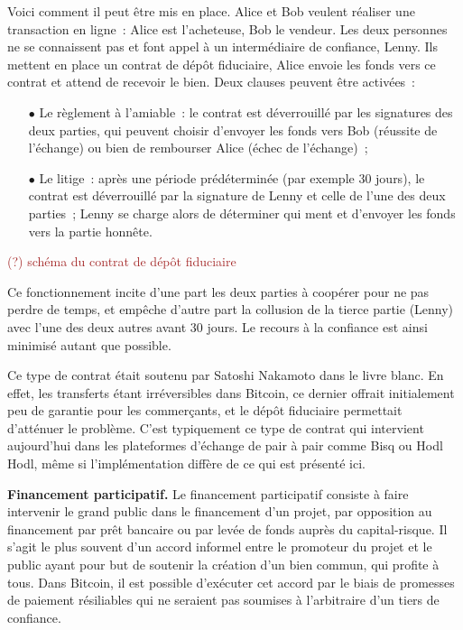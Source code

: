 Voici comment il peut être mis en place. Alice et Bob veulent réaliser une transaction en ligne~: Alice est l'acheteuse, Bob le vendeur. Les deux personnes ne se connaissent pas et font appel à un intermédiaire de confiance, Lenny. Ils mettent en place un contrat de dépôt fiduciaire, Alice envoie les fonds vers ce contrat et attend de recevoir le bien. Deux clauses peuvent être activées~:

\begin{itemize}
\item[$\bullet$] Le règlement à l'amiable~: le contrat est déverrouillé par les signatures des deux parties, qui peuvent choisir d'envoyer les fonds vers Bob (réussite de l'échange) ou bien de rembourser Alice (échec de l'échange)~;
\item[$\bullet$] Le litige~: après une période prédéterminée (par exemple 30 jours), le contrat est déverrouillé par la signature de Lenny et celle de l'une des deux parties~; Lenny se charge alors de déterminer qui ment et d'envoyer les fonds vers la partie honnête.
\end{itemize}

\textcolor{brown}{(?) schéma du contrat de dépôt fiduciaire}

Ce fonctionnement incite d'une part les deux parties à coopérer pour ne pas perdre de temps, et empêche d'autre part la collusion de la tierce partie (Lenny) avec l'une des deux autres avant 30 jours. Le recours à la confiance est ainsi minimisé autant que possible.

Ce type de contrat était soutenu par Satoshi Nakamoto dans le livre blanc. En effet, les transferts étant irréversibles dans Bitcoin, ce dernier offrait initialement peu de garantie pour les commerçants, et le dépôt fiduciaire permettait d'atténuer le problème. C'est typiquement ce type de contrat qui intervient aujourd'hui dans les plateformes d'échange de pair à pair comme Bisq ou Hodl Hodl, même si l'implémentation diffère de ce qui est présenté ici.


\textbf{Financement participatif.} Le financement participatif consiste à faire intervenir le grand public dans le financement d'un projet, par opposition au financement par prêt bancaire ou par levée de fonds auprès du capital-risque. Il s'agit le plus souvent d'un accord informel entre le promoteur du projet et le public ayant pour but de soutenir la création d'un bien commun, qui profite à tous. Dans Bitcoin, il est possible d'exécuter cet accord par le biais de promesses de paiement résiliables qui ne seraient pas soumises à l'arbitraire d'un tiers de confiance.

